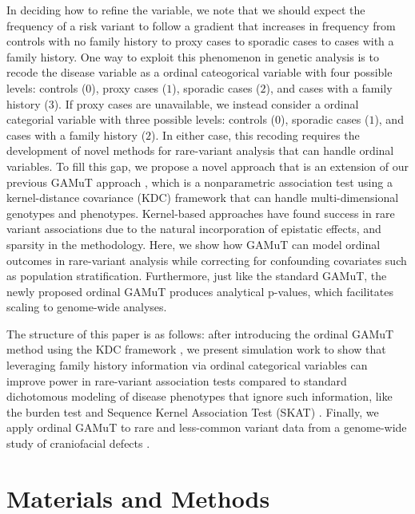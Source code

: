 \documentclass[]{article}
\begin{document}
In deciding how to refine the variable, we note that we should expect the frequency of a risk variant to follow a gradient that increases in frequency from controls with no family history to proxy cases to sporadic cases to cases with a family history. One way to exploit this phenomenon in genetic analysis is to recode the disease variable as a ordinal cateogorical variable with four possible levels: controls (\(0\)), proxy cases (\(1\)), sporadic cases (\(2\)), and cases with a family history (\(3\)). If proxy cases are unavailable, we instead consider a ordinal categorial variable with three possible levels: controls (\(0\)), sporadic cases (\(1\)), and cases with a family history (\(2\)). In either case, this recoding requires the development of novel methods for rare-variant analysis that can handle ordinal variables. To fill this gap, we propose a novel approach that is an extension of our previous GAMuT approach \citep{Broadaway2016}, which is a nonparametric association test using a kernel-distance covariance (KDC) framework that can handle multi-dimensional genotypes and phenotypes.
Kernel-based approaches have found success in rare variant associations due to the natural incorporation of epistatic effects, and sparsity in the methodology.
Here, we show how GAMuT can model ordinal outcomes in rare-variant analysis while correcting for confounding covariates such as population stratification. Furthermore, just like the standard GAMuT, the newly proposed ordinal GAMuT produces analytical p-values, which facilitates scaling to genome-wide analyses.

The structure of this paper is as follows: after introducing the ordinal GAMuT method using the KDC framework
\citep{Gretton2008, Szekely2007, Kosorok2009, Zhang2012, Hua2015}, we present simulation work to
show that leveraging family history information via
ordinal categorical variables can improve power in
rare-variant association tests compared to standard dichotomous
modeling of disease phenotypes that ignore such information, like the burden test \citep{Li2008, Madsen2009} and Sequence Kernel Association Test (SKAT) \citep{Wu2011}.
Finally, we apply ordinal GAMuT to rare and less-common variant data from a genome-wide study of craniofacial defects
\citep{Leslie2016, Leslie2016b, Mostowska2018}.

\hypertarget{materials-and-methods}{%
\section{Materials and Methods}\label{materials-and-methods}}
\end{document}
